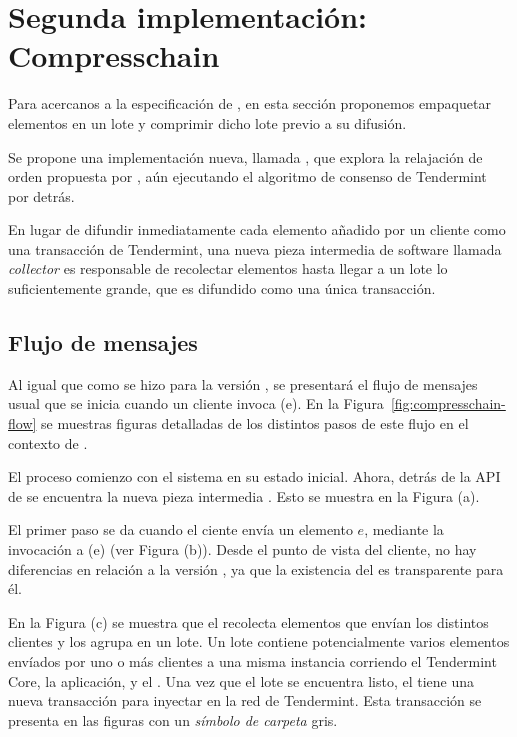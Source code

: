 

\section{Segunda implementación: Compresschain}\label{subsec:compresschain}

Para acercanos a la especificación de \setchain, en esta sección proponemos
empaquetar elementos en un lote y comprimir dicho lote
previo a su difusión.
%

Se propone una implementación nueva, llamada \compresschain, que explora
la relajación de orden propuesta por \setchain, aún ejecutando el algoritmo de
consenso de Tendermint por detrás.
%

En lugar de difundir inmediatamente cada elemento añadido por un cliente como una
transacción de Tendermint, una nueva pieza intermedia de software llamada \textit{collector}
es responsable de recolectar elementos hasta llegar a un lote lo suficientemente grande,
que es difundido como una única transacción.
%

\subsection{Flujo de mensajes}
Al igual que como se hizo para la versión \vanilla, se presentará el flujo de mensajes usual
que se inicia cuando un cliente invoca \Add(e).
En la Figura~\ref{fig:compresschain-flow} se muestras figuras detalladas de los distintos pasos de
este flujo en el contexto de \compresschain.
%

El proceso comienzo con el sistema en su estado inicial. Ahora, detrás de la API de \setchain
se encuentra la nueva pieza intermedia \collector. Esto se muestra en la Figura (a).

%

El primer paso se da cuando el ciente envía un elemento $e$, mediante la invocación a \Add(e) (ver
Figura (b)).
Desde el punto de vista del cliente, no hay diferencias en relación a la versión \vanilla, ya que
la existencia del \collector es transparente para él.

%

En la Figura (c) se muestra que el \collector recolecta elementos que envían los distintos clientes y los agrupa
en un lote.
Un lote contiene potencialmente varios elementos envíados por uno o más clientes a una misma instancia
corriendo el Tendermint Core, la aplicación, y el \collector.
Una vez que el lote se encuentra listo, el \collector tiene una nueva transacción para inyectar en la red de Tendermint.
Esta transacción se presenta en las figuras con un \textit{símbolo de carpeta} gris.

